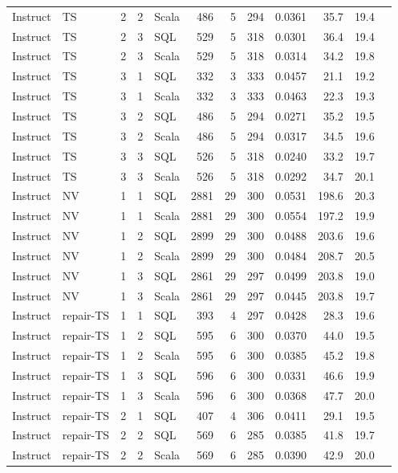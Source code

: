{\begin{longtable}{@{}llcclrrrrrrc@{}}
Instruct & TS & 2 & 2 & Scala & 486 & 5 & 294 & 0.0361 & 35.7 & 19.4 & \\
Instruct & TS & 2 & 3 & SQL & 529 & 5 & 318 & 0.0301 & 36.4 & 19.4 & \\
Instruct & TS & 2 & 3 & Scala & 529 & 5 & 318 & 0.0314 & 34.2 & 19.8 & \\
Instruct & TS & 3 & 1 & SQL & 332 & 3 & 333 & 0.0457 & 21.1 & 19.2 & \\
Instruct & TS & 3 & 1 & Scala & 332 & 3 & 333 & 0.0463 & 22.3 & 19.3 & \\
Instruct & TS & 3 & 2 & SQL & 486 & 5 & 294 & 0.0271 & 35.2 & 19.5 & \\
Instruct & TS & 3 & 2 & Scala & 486 & 5 & 294 & 0.0317 & 34.5 & 19.6 & \\
Instruct & TS & 3 & 3 & SQL & 526 & 5 & 318 & 0.0240 & 33.2 & 19.7 & \\
Instruct & TS & 3 & 3 & Scala & 526 & 5 & 318 & 0.0292 & 34.7 & 20.1 & \\
Instruct & NV & 1 & 1 & SQL & 2881 & 29 & 300 & 0.0531 & 198.6 & 20.3 & \\
Instruct & NV & 1 & 1 & Scala & 2881 & 29 & 300 & 0.0554 & 197.2 & 19.9 & \\
Instruct & NV & 1 & 2 & SQL & 2899 & 29 & 300 & 0.0488 & 203.6 & 19.6 & \\
Instruct & NV & 1 & 2 & Scala & 2899 & 29 & 300 & 0.0484 & 208.7 & 20.5 & \\
Instruct & NV & 1 & 3 & SQL & 2861 & 29 & 297 & 0.0499 & 203.8 & 19.0 & \\
Instruct & NV & 1 & 3 & Scala & 2861 & 29 & 297 & 0.0445 & 203.8 & 19.7 & \\
Instruct & repair-TS & 1 & 1 & SQL & 393 & 4 & 297 & 0.0428 & 28.3 & 19.6 & \\
Instruct & repair-TS & 1 & 2 & SQL & 595 & 6 & 300 & 0.0370 & 44.0 & 19.5 & \\
Instruct & repair-TS & 1 & 2 & Scala & 595 & 6 & 300 & 0.0385 & 45.2 & 19.8 & \\
Instruct & repair-TS & 1 & 3 & SQL & 596 & 6 & 300 & 0.0331 & 46.6 & 19.9 & \\
Instruct & repair-TS & 1 & 3 & Scala & 596 & 6 & 300 & 0.0368 & 47.7 & 20.0 & \\
Instruct & repair-TS & 2 & 1 & SQL & 407 & 4 & 306 & 0.0411 & 29.1 & 19.5 & \\
Instruct & repair-TS & 2 & 2 & SQL & 569 & 6 & 285 & 0.0385 & 41.8 & 19.7 & \\
Instruct & repair-TS & 2 & 2 & Scala & 569 & 6 & 285 & 0.0390 & 42.9 & 20.0 & \\

\end{longtable}}
